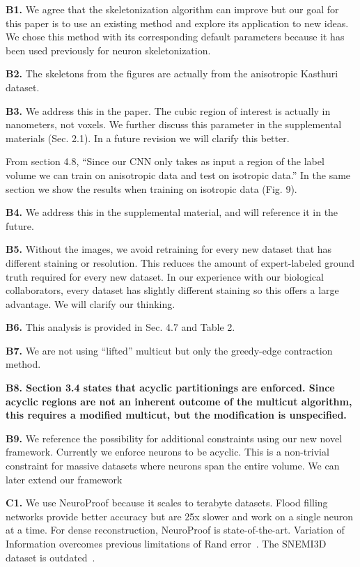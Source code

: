 \documentclass[10pt,twocolumn,letterpaper]{article}
\begin{document}
\textbf{B1.} 
We agree that the skeletonization algorithm can improve but our goal for this paper is to use an existing method and explore its application to new ideas.
We chose this method with its corresponding default parameters because it has been used previously for neuron skeletonization.

\textbf{B2.} 
The skeletons from the figures are actually from the anisotropic Kasthuri dataset.

\textbf{B3.} 
We address this in the paper.
The cubic region of interest is actually in nanometers, not voxels.
We further discuss this parameter in the supplemental materials (Sec. 2.1). 
In a future revision we will clarify this better.

From section 4.8, ``Since our CNN only takes as input a region of the label volume we can train on anisotropic data and test on isotropic data.'' 
In the same section we show the results when training on isotropic data (Fig. 9). 

\textbf{B4.} 
We address this in the supplemental material, and will reference it in the future.

\textbf{B5.} 
Without the images, we avoid retraining for every new dataset that has different staining or resolution.
This reduces the amount of expert-labeled ground truth required for every new dataset.
In our experience with our biological collaborators, every dataset has slightly different staining so this offers a large advantage.
We will clarify our thinking.

\textbf{B6.} 
This analysis is provided in Sec. 4.7 and Table 2.

\textbf{B7.} 
We are not using ``lifted'' multicut but only the greedy-edge contraction method.

\textbf{B8. Section 3.4 states that acyclic partitionings are enforced. Since acyclic regions are not an inherent outcome of the multicut algorithm, this requires a modified multicut, but the modification is unspecified.}

\textbf{B9.} 
We reference the possibility for additional constraints using our new novel framework. 
Currently we enforce neurons to be acyclic.
This is a non-trivial constraint for massive datasets where neurons span the entire volume. 
We can later extend our framework 

\textbf{C1.} We use NeuroProof because it scales to terabyte datasets. 
Flood filling networks provide better accuracy but are 25x slower and work on a single neuron at a time. 
For dense reconstruction, NeuroProof is state-of-the-art. 
Variation of Information overcomes previous limitations of Rand error~\cite{lee2017superhuman,nunez2013machine}. 
The SNEMI3D dataset is outdated~\cite{lee2017superhuman}. 
\end{document}
